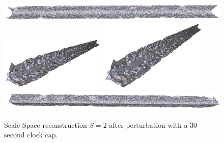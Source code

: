 \documentclass[12pt]{drexelthesis}
\begin{document}
\begin{figure}[!ht]
	
	\centering
		\includegraphics[width=5in]{simulated-lab-scan/0noise/optimizedNeat/scalespace2perturb00.png}
		\includegraphics[width=2in]{simulated-lab-scan/0noise/optimizedNeat/scalespace2perturb01.png}
		\includegraphics[width=2in]{simulated-lab-scan/0noise/optimizedNeat/scalespace2perturb02.png}
		\includegraphics[width=5in]{simulated-lab-scan/0noise/optimizedNeat/scalespace2perturb03.png}
		\caption[Scale-Space reconstruction $S = 2$ after perturbation with a 30 second clock cap]{\centering Scale-Space reconstruction $S = 2$ after perturbation with a 30 second clock cap.}
	\label{zeronoise:scalespace2perturb}
\end{figure}
\end{document}
